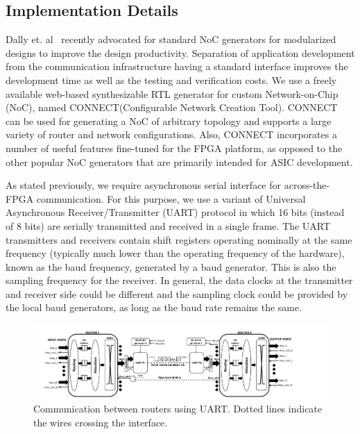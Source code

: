 \documentclass[conference, 9pt]{IEEEtran}
\begin{document}
\subsection{Implementation Details}

Dally et. al~\cite{dally201321st} recently advocated for standard NoC generators for modularized designs to improve the design productivity. Separation of application development from the communication infrastructure having a standard interface improves the development time as well as the testing and verification costs. We use a freely available web-based synthesizable RTL generator for custom Network-on-Chip (NoC), named CONNECT(Configurable Network Creation Tool). CONNECT~\cite{papamichael2012connect} can be used for generating a NoC of arbitrary topology and supports a large variety of router and network configurations. Also, CONNECT incorporates a number of useful features fine-tuned for the FPGA platform, as opposed to the other popular NoC generators that are primarily intended for ASIC development.

As stated previously, we require asynchronous serial interface for across-the-FPGA communication. For this purpose, we use a variant of Universal Asynchronous Receiver/Transmitter (UART) protocol in which 16 bits (instead of 8 bits) are serially transmitted and received in a single frame. The UART transmitters and receivers contain shift registers operating nominally at the same frequency (typically much lower than the operating frequency of the hardware), known as the baud frequency, generated by a baud generator. This is also the sampling frequency for the receiver. In general, the data clocks at the transmitter and receiver side could be different and the sampling clock could be provided by the local baud generators, as long as the baud rate remains the same. 



\begin{figure}[htpb!]
\centering
\includegraphics[scale=0.28]{figs/interface.pdf}
\caption{Communication between routers using UART. Dotted lines indicate the wires crossing the interface.}
\label{fig:interface}
\end{figure}
\end{document}
